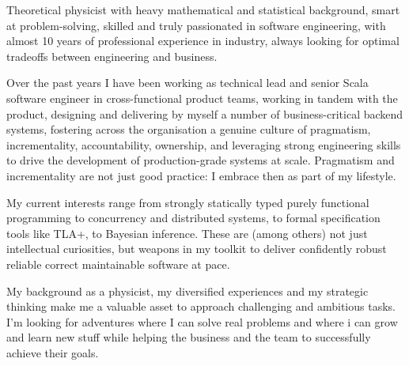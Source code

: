 
\begin{cvparagraph}
Theoretical physicist with heavy mathematical and statistical 
background, smart at problem-solving, skilled and truly passionated in software engineering, with almost 10 years of professional experience in industry, always looking for optimal tradeoffs between engineering and business.

  Over the past years I have been working as technical lead and senior Scala software engineer in cross-functional product teams, working in tandem with the product, designing and delivering by myself a number of business-critical backend systems, fostering  across the organisation a genuine culture of pragmatism, incrementality, accountability, ownership, and leveraging strong engineering skills 
  to drive the development of production-grade systems at scale. Pragmatism and incrementality are not just good practice: I embrace then as part of my lifestyle.

  My current interests range from strongly statically typed purely functional programming to concurrency and distributed systems, to formal specification tools like TLA+, to Bayesian inference. These are (among others) not just intellectual curiosities, but weapons in my toolkit to deliver confidently robust reliable correct maintainable software at pace. 

My background as a physicist, my diversified experiences and my strategic thinking make me a valuable asset to approach challenging and ambitious tasks. I'm looking for adventures where I can solve real problems and where i can grow and learn new stuff while helping the business and the team to successfully achieve their goals. 
\end{cvparagraph}
